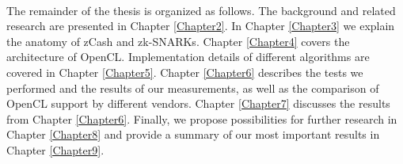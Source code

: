 \\
The remainder of the thesis is organized as follows. The background and related research are presented in Chapter \ref{Chapter2}. In Chapter \ref{Chapter3} we explain the anatomy of zCash and zk-SNARKs. Chapter \ref{Chapter4} covers the architecture of OpenCL. Implementation details of different algorithms are covered in Chapter \ref{Chapter5}. Chapter \ref{Chapter6} describes the tests we performed and the results of our measurements, as well as the comparison of OpenCL support by different vendors. Chapter \ref{Chapter7} discusses the results from Chapter \ref{Chapter6}. Finally, we propose possibilities for further research in Chapter \ref{Chapter8} and provide a summary of our most important results in Chapter \ref{Chapter9}.
